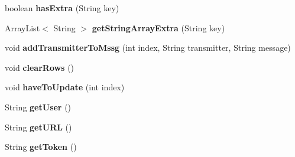\begin{DoxyCompactItemize}
\item 
boolean {\bfseries has\+Extra} (String key)\hypertarget{classcom_1_1example_1_1sebastian_1_1tindertp_1_1ChatListActivity_a9a0f83b9c4dff4cb75afd7cd5c997851}{}\label{classcom_1_1example_1_1sebastian_1_1tindertp_1_1ChatListActivity_a9a0f83b9c4dff4cb75afd7cd5c997851}

\item 
Array\+List$<$ String $>$ {\bfseries get\+String\+Array\+Extra} (String key)\hypertarget{classcom_1_1example_1_1sebastian_1_1tindertp_1_1ChatListActivity_a7a092728c0205493559c6f6146c1d473}{}\label{classcom_1_1example_1_1sebastian_1_1tindertp_1_1ChatListActivity_a7a092728c0205493559c6f6146c1d473}

\item 
void {\bfseries add\+Transmitter\+To\+Mssg} (int index, String transmitter, String message)\hypertarget{classcom_1_1example_1_1sebastian_1_1tindertp_1_1ChatListActivity_ab659604d353e809c1e12d72053e920a1}{}\label{classcom_1_1example_1_1sebastian_1_1tindertp_1_1ChatListActivity_ab659604d353e809c1e12d72053e920a1}

\item 
void {\bfseries clear\+Rows} ()\hypertarget{classcom_1_1example_1_1sebastian_1_1tindertp_1_1ChatListActivity_aa294e0a521a22f21393d29d1840aa3c3}{}\label{classcom_1_1example_1_1sebastian_1_1tindertp_1_1ChatListActivity_aa294e0a521a22f21393d29d1840aa3c3}

\item 
void {\bfseries have\+To\+Update} (int index)\hypertarget{classcom_1_1example_1_1sebastian_1_1tindertp_1_1ChatListActivity_aea48a7b0905e33ebca450dd364105196}{}\label{classcom_1_1example_1_1sebastian_1_1tindertp_1_1ChatListActivity_aea48a7b0905e33ebca450dd364105196}

\item 
String {\bfseries get\+User} ()\hypertarget{classcom_1_1example_1_1sebastian_1_1tindertp_1_1ChatListActivity_a3e76639eeb1fb378c39c6e5a13d25b06}{}\label{classcom_1_1example_1_1sebastian_1_1tindertp_1_1ChatListActivity_a3e76639eeb1fb378c39c6e5a13d25b06}

\item 
String {\bfseries get\+U\+RL} ()\hypertarget{classcom_1_1example_1_1sebastian_1_1tindertp_1_1ChatListActivity_a44b8c1f88fd97d51746d98b1ced4cd34}{}\label{classcom_1_1example_1_1sebastian_1_1tindertp_1_1ChatListActivity_a44b8c1f88fd97d51746d98b1ced4cd34}

\item 
String {\bfseries get\+Token} ()\hypertarget{classcom_1_1example_1_1sebastian_1_1tindertp_1_1ChatListActivity_a23ab2faa47aa495f110696b027d52f7f}{}\label{classcom_1_1example_1_1sebastian_1_1tindertp_1_1ChatListActivity_a23ab2faa47aa495f110696b027d52f7f}


\end{DoxyCompactItemize}
